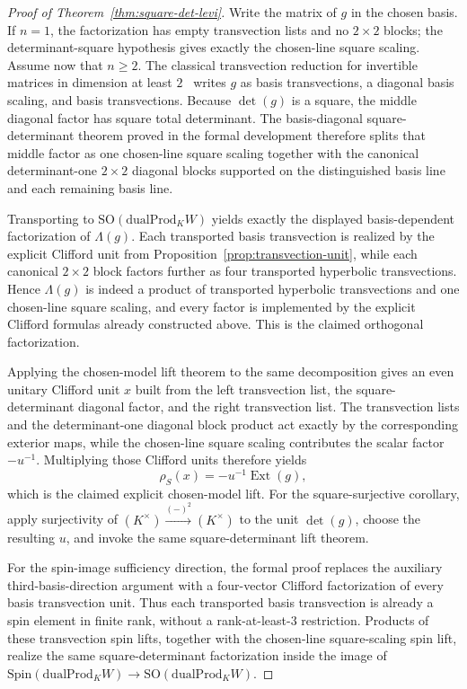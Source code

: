 \documentclass{birkjour}
\theoremstyle{plain}
\theoremstyle{definition}
\theoremstyle{remark}
\newcommand{\Spin}{\mathrm{Spin}}
\newcommand{\SO}{\mathrm{SO}}
\newcommand{\dualProd}{\mathrm{dualProd}}
\newcommand{\ExtMap}{\operatorname{Ext}}
\begin{document}
\begin{proof}[Proof of Theorem~\ref{thm:square-det-levi}]
Write the matrix of $g$ in the chosen basis. If \(n=1\), the factorization has
empty transvection lists and no \(2\times2\) blocks; the determinant-square
hypothesis gives exactly the chosen-line square scaling. Assume now that
\(n\ge2\). The classical transvection reduction for invertible matrices in
dimension at least $2$~\cite[Ch.~IV]{Artin1957GeometricAlgebra} writes $g$ as
basis transvections, a diagonal basis scaling, and basis transvections. Because
$\det(g)$ is a square, the middle diagonal factor has square total determinant.
The basis-diagonal square-determinant theorem proved in the formal development
therefore splits that middle factor as one chosen-line square scaling together
with the canonical determinant-one $2\times2$ diagonal blocks supported on the
distinguished basis line and each remaining basis line.

Transporting to $\SO(\dualProd_K W)$ yields exactly the displayed basis-dependent
factorization of $\Lambda(g)$. Each transported basis transvection is realized
by the explicit Clifford unit from Proposition~\ref{prop:transvection-unit},
while each canonical $2\times2$ block factors further as four transported
hyperbolic transvections. Hence $\Lambda(g)$ is indeed a product of transported
hyperbolic transvections and one chosen-line square scaling, and every factor is
implemented by the explicit Clifford formulas already constructed above. This is
the claimed orthogonal factorization.

Applying the chosen-model lift theorem to the same decomposition gives an even
unitary Clifford unit $x$ built from the left transvection list, the
square-determinant diagonal factor, and the right transvection list. The
transvection lists and the determinant-one diagonal block product act exactly by
the corresponding exterior maps, while the chosen-line square scaling
contributes the scalar factor $-u^{-1}$. Multiplying those Clifford units
therefore yields
\[
  \rho_S(x)=-u^{-1}\ExtMap(g),
\]
which is the claimed explicit chosen-model lift.
For the square-surjective corollary, apply surjectivity of
\((K^\times)\xrightarrow{(-)^2}(K^\times)\) to the unit \(\det(g)\), choose
the resulting $u$, and invoke the same square-determinant lift theorem.

For the spin-image sufficiency direction, the formal proof replaces the auxiliary
third-basis-direction argument with a four-vector Clifford factorization of every
basis transvection unit. Thus each transported basis transvection is already a
spin element in finite rank, without a rank-at-least-$3$ restriction. Products
of these transvection spin lifts, together with the chosen-line square-scaling
spin lift, realize the same square-determinant factorization inside the image of
\(\Spin(\dualProd_K W)\to\SO(\dualProd_K W)\).


\end{proof}
\end{document}
